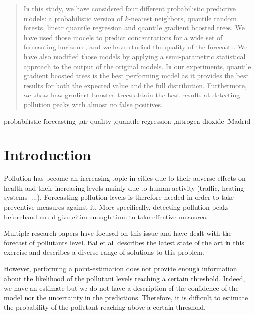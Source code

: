 \documentclass[a4paper,twocolumn,5p]{elsarticle}
\begin{document}
\begin{frontmatter}
\begin{abstract}
  In this study, we have %
  considered four different probabilistic predictive models: a
  probabilistic version of $k$-nearest neighbors, quantile random
  forests, linear quantile regression and quantile gradient boosted
  trees.  We have used those models to predict \no concentrations for
  a wide set of forecasting horizons%
  , and we have studied the quality of the forecasts.  We have also
  modified those models by applying a semi-parametric statistical
  approach to the output of the original models.  In our experiments,
  quantile gradient boosted trees is the best performing model as it
  provides the best results for both the expected value and the full
  distribution. Furthermore, we show how gradient boosted trees obtain
  the best results at detecting pollution peaks with almost no false
  positives.
\end{abstract}

\begin{keyword}
probabilistic forecasting \sep air quality \sep quantile regression
\sep nitrogen dioxide \sep Madrid
\end{keyword}

\end{frontmatter}


\section{Introduction }
\label{sec:intro}


Pollution has become an increasing topic in cities due to their
adverse effects on health and their increasing levels mainly due to
human activity (traffic, heating systems, ...). Forecasting pollution
levels is therefore needed in order to take preventive measures
against it. More specifically, detecting pollution peaks beforehand
could give cities enough time to take effective measures.

Multiple research papers have focused on this issue and have dealt
with the forecast of pollutants level. Bai et al. \cite{bai_air_2018}
describes the latest state of the art in this exercise and describes 
a diverse range of solutions to this problem.

However, performing a point-estimation does not provide enough 
information about the likelihood of the pollutant levels 
reaching a certain 
threshold. Indeed, we have an estimate but we do not have a
description of the confidence of the model nor the uncertainty 
in the predictions. Therefore, it is difficult to estimate the 
probability of the pollutant reaching above a certain threshold.
\end{document}
